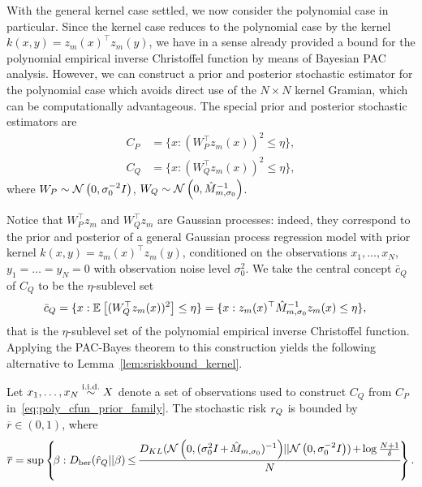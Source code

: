 \documentclass[onefignum,onetabnum]{siamart171218}
\begin{document}
With the general kernel case settled, we now consider the polynomial case in
particular. Since the kernel case reduces to the polynomial case by the kernel
$k(x,y)=z_m(x)^\top z_m(y)$, we have in a sense already provided a bound for the
polynomial empirical inverse Christoffel function by means of Bayesian PAC
analysis. However, we can construct a prior and posterior stochastic estimator
for the polynomial case which avoids direct use of the $N\times N$ kernel
Gramian, which can be computationally advantageous. The special prior and
posterior stochastic estimators are
\begin{equation}
    \begin{aligned}
        \label{eq:poly_cfun_prior_family}
        C_{P} &= \{x: (W_P^\top z_m(x))^2 \le \eta\},
        \\
        C_{Q} &= \{x: (W_Q^\top z_m(x))^2 \le \eta\},
    \end{aligned}
\end{equation}
where
$W_P\sim\mathcal{N}\left(0,\sigma_0^{-2} I\right)$,
$W_Q\sim\mathcal{N}\left(0, \hat{M}_{m,\sigma_0}^{-1}\right)$.

Notice that $W_P^\top z_m$ and $W_Q^\top z_m$ are Gaussian processes: indeed,
they correspond to
the prior and posterior of a general Gaussian process
regression model with prior kernel $k(x,y)=z_m(x)^\top z_m(y)$, conditioned on
the observations $x_1,\dotsc,x_N$, $y_1=\dotso=y_N=0$ with observation noise
level $\sigma_0^2$.
We take the central concept $\bar{c}_{Q}$ of $C_{Q}$ to be the $\eta$-sublevel set 
\begin{align}
    \bar{c}_{Q} 
    &= \{x: \mathbb{E}_{ }\left[(W_Q^\top z_m(x))^2\right] \le \eta\}
    = \{x:
        z_m(x)^\top \hat{M}_{m,\sigma_0}^{-1} z_m(x)
    \le\eta\},
\end{align}
that is the $\eta$-sublevel set of the polynomial empirical inverse Christoffel
function.
Applying the PAC-Bayes theorem to this construction yields the following
alternative to Lemma~\ref{lem:sriskbound_kernel}.
\begin{lemma}
    \label{lem:sriskbound_poly}
   Let $x_1,\dotsc,x_N\overset{\textrm{i.i.d.}}{\sim} X$ denote a set of observations used to construct
   $C_{Q}$ from $C_{P}$
   in~\eqref{eq:poly_cfun_prior_family}. 
   The stochastic risk $r_{Q}$
   is bounded by $\overline{r}\in(0,1)$, 
   where
   \begin{equation}
       \label{eq:pacbayes_poly}
       \overline{r} = \sup \left\{\hspace{-2pt} \beta : 
       D_{\text{ber}}(\hat{r}_{Q} || \beta)
       \hspace{-1pt}\le\hspace{-1pt}
       \frac{D_{KL}(\mathcal{N}\left(0,(\sigma_0^{2}I \hspace{-1pt}+\hspace{-1pt} \hat{M}_{m,\sigma_0})^{-1}\right)\hspace{-2pt}|| \mathcal{N}\left(0,\sigma_0^{-2}I\right))
           \hspace{-1pt}+\hspace{-1pt} \log\frac{N+1}{\delta}
   }{N}\hspace{-2pt}\right\}.
   \end{equation}
\end{lemma}
\end{document}
